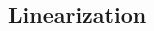 \documentclass[letterpaper,11pt]{article}
\theoremstyle{definition}
\begin{document}
\begin{spacing}{1.5}








\section*{Linearization}\label{Linear_HW}


\end{spacing}
\end{document}
